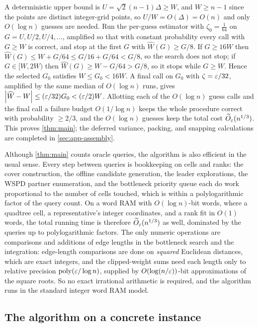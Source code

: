 A deterministic upper bound is $U=\sqrt2(n-1)\Delta\ge W$, and $W\ge n-1$ since the points are distinct
integer-grid points, so $U/W=O(\Delta)=O(n)$ and only $O(\log n)$ guesses are needed. Run the per-guess
estimator with $\zeta_0=\tfrac1{64}$ on $G=U,U/2,U/4,\dots$, amplified so that with constant probability
every call with $G\ge W$ is correct, and stop at the first $G$ with $\widehat W(G)\ge G/8$. If $G\ge16W$
then $\widehat W(G)\le W+G/64\le G/16+G/64<G/8$, so the search does not stop; if $G\in[W,2W)$ then
$\widehat W(G)\ge W-G/64>G/8$, so it stops while $G\ge W$. Hence the selected $G_0$ satisfies $W\le
G_0<16W$. A final call on $G_0$ with $\zeta=\varepsilon/32$, amplified by the same median of $O(\log n)$ runs,
gives $\left|\widehat W-W\right|\le(\varepsilon/32)G_0<(\varepsilon/2)W$. Allotting each of the $O(\log n)$ guess calls and the
final call a failure budget $O(1/\log n)$ keeps the whole procedure correct with probability $\ge 2/3$,
and the $O(\log n)$ guesses keep the total cost $\widetilde{O}_\varepsilon(n^{1/3})$. This proves \cref{thm:main}; the
deferred variance, packing, and snapping calculations are completed in \cref{sec:app-assembly}.

\begin{remark}\label{rem:time}
Although \cref{thm:main} counts oracle queries, the algorithm is also efficient in the usual sense. Every
step between queries is bookkeeping on cells and ranks: the cover construction, the offline candidate
generation, the leader explorations, the WSPD partner enumeration, and the bottleneck priority queue each
do work proportional to the number of cells touched, which is within a polylogarithmic factor of the query
count. On a word RAM with $O(\log n)$-bit words, where a quadtree cell, a representative's integer coordinates,
and a rank fit in $O(1)$ words, the total running time is therefore $\widetilde{O}_\varepsilon(n^{1/3})$ as well,
dominated by the queries up to polylogarithmic factors. The only numeric operations are comparisons and
additions of edge lengths in the bottleneck search and the integration: edge-length comparisons are done
on \emph{squared} Euclidean distances, which are exact integers, and the clipped-weight sums need each
length only to relative precision $\operatorname{poly}(\varepsilon/\log n)$, supplied by $O(\log(n/\varepsilon))$-bit approximations of
the square roots. So no exact irrational arithmetic is required, and the algorithm runs in the standard
integer word RAM model.
\end{remark}

\subsection{The algorithm on a concrete instance}\label{sec:main-example}

